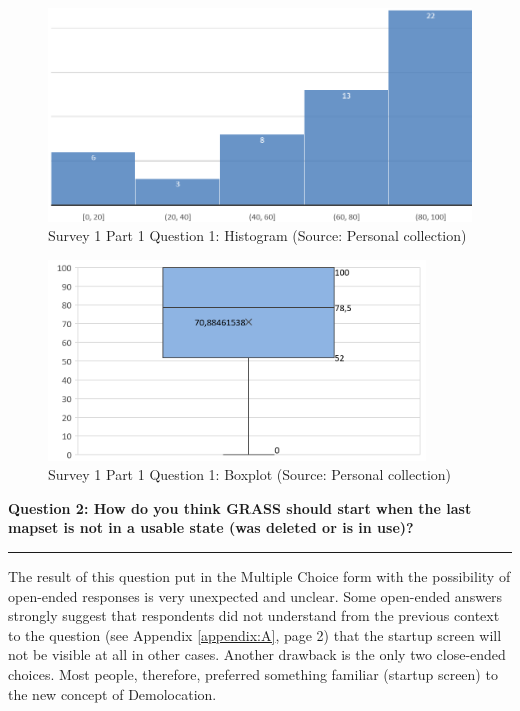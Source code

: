 \documentclass[a4paper,10pt,twoside]{article}
\begin{document}
\begin{figure}[hbt!] 
\begin{center}
\includegraphics[width=12cm]{../surveys/analyzed_data/survey1_part1_question1_excel_histogram.png} 
\caption[Survey 1 Part 1 Question 1: Histogram]{Survey 1 Part 1 Question 1: Histogram (Source: Personal collection)}
\label{fig:survey1_part1_question1_histogram}
\end{center}
\end{figure}

\vspace{0.3cm}
\begin{figure}[hbt!] 
\begin{center}
\includegraphics[width=10cm]{../surveys/analyzed_data/survey1_part1_question1_excel_boxplot.png} 
\caption[Survey 1 Part 1 Question 1: Boxplot]{Survey 1 Part 1 Question 1: Boxplot (Source: Personal collection)}
\label{fig:survey1_part1_question1_boxplot}
\end{center}
\end{figure}

\newpage
\noindent \textbf{Question 2: How do you think GRASS should start when the last mapset is not in a usable state (was deleted or is in use)?}
\par\noindent\rule{\textwidth}{0.4pt}

\noindent The result of this question put in the Multiple Choice form
with the possibility of open-ended responses is very unexpected and
unclear. Some open-ended answers strongly suggest that respondents did
not understand from the previous context to the question (see Appendix
\ref{appendix:A}, page 2) that the startup screen will not be visible
at all in other cases. Another drawback is the only two close-ended
choices. Most people, therefore, preferred something familiar (startup
screen) to the new concept of Demolocation.
\end{document}
